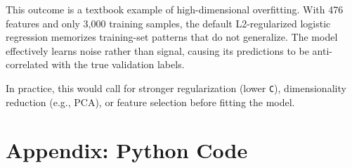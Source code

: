\documentclass[12pt]{article}
\begin{document}
	This outcome is a textbook example of high-dimensional overfitting. With 476 features and only 3{,}000 training samples, the default L2-regularized logistic regression memorizes training-set patterns that do not generalize. The model effectively learns noise rather than signal, causing its predictions to be anti-correlated with the true validation labels.

	In practice, this would call for stronger regularization (lower \texttt{C}), dimensionality reduction (e.g., PCA), or feature selection before fitting the model.

	\newpage
	\section{Appendix: Python Code}

	
\end{document}
